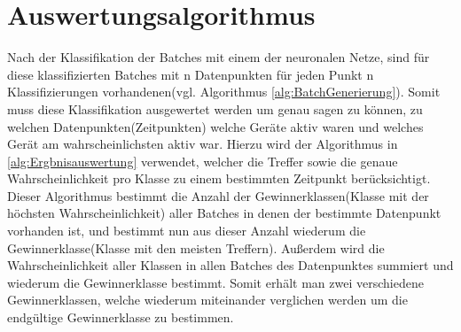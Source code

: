     \section{Auswertungsalgorithmus}\label{Auswertungsalgorithmus}
        Nach der Klassifikation der Batches mit einem der neuronalen Netze, sind für diese klassifizierten Batches mit n Datenpunkten für jeden Punkt n Klassifizierungen vorhandenen(vgl. Algorithmus \ref{alg:BatchGenerierung}).
        Somit muss diese Klassifikation ausgewertet werden um genau sagen zu können, zu welchen Datenpunkten(Zeitpunkten) welche Geräte aktiv waren und welches Gerät am wahrscheinlichsten aktiv war.
        Hierzu wird der Algorithmus in \ref{alg:Ergbnisauswertung} verwendet, welcher die Treffer sowie die genaue Wahrscheinlichkeit pro Klasse zu einem bestimmten Zeitpunkt berücksichtigt. 
        Dieser Algorithmus bestimmt die Anzahl der Gewinnerklassen(Klasse mit der höchsten Wahrscheinlichkeit) aller Batches in denen der bestimmte Datenpunkt vorhanden ist, und bestimmt nun aus dieser Anzahl wiederum die Gewinnerklasse(Klasse mit den meisten Treffern).
        Außerdem wird die Wahrscheinlichkeit aller Klassen in allen Batches des Datenpunktes summiert und wiederum die Gewinnerklasse bestimmt.
        Somit erhält man zwei verschiedene Gewinnerklassen, welche wiederum miteinander verglichen werden um die endgültige Gewinnerklasse zu bestimmen.


